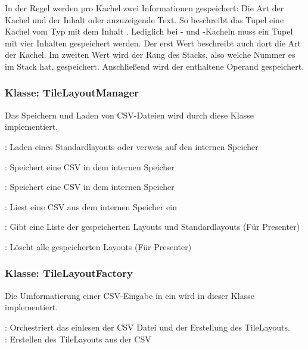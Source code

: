 In der Regel werden pro Kachel zwei Informationen gespeichert: Die Art der Kachel und der Inhalt oder anzuzeigende Text. So beschreibt das Tupel  eine Kachel vom Typ  mit dem Inhalt . Lediglich bei - und -Kacheln muss ein Tupel mit vier Inhalten gespeichert werden. Der erst Wert beschreibt auch dort die Art der Kachel. Im zweiten Wert wird der Rang des Stacks, also welche Nummer es im Stack hat, gespeichert. Anschließend wird der enthaltene Operand gespeichert. 

\subsubsection{Klasse: TileLayoutManager}
Das Speichern und Laden von CSV-Dateien wird durch diese Klasse implementiert.

: Laden eines Standardlayouts oder verweis auf den internen Speicher

: Speichert eine CSV in dem internen Speicher 

: Speichert eine CSV in dem internen Speicher 

: Liest eine CSV aus dem internen Speicher ein 

: Gibt eine Liste der gespeicherten Layouts und Standardlayouts (Für Presenter) 

: Löscht alle gespeicherten Layouts (Für Presenter)

\subsubsection{Klasse: TileLayoutFactory}
Die Umformatierung einer CSV-Eingabe in ein  wird in dieser Klasse implementiert.

: Orchestriert das einlesen der CSV Datei und der Erstellung des TileLayouts. \\
: Erstellen des TileLayouts aus der CSV
